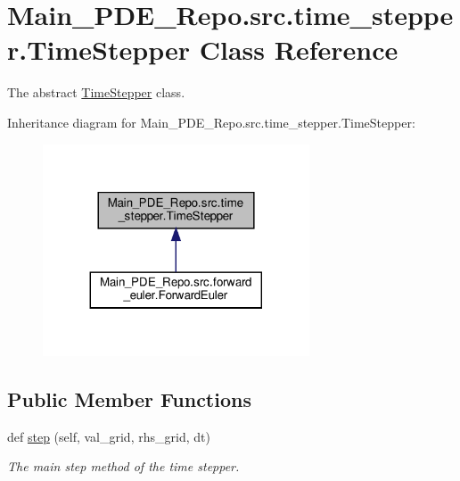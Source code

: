 \hypertarget{classMain__PDE__Repo_1_1src_1_1time__stepper_1_1TimeStepper}{}\section{Main\+\_\+\+P\+D\+E\+\_\+\+Repo.\+src.\+time\+\_\+stepper.\+Time\+Stepper Class Reference}
\label{classMain__PDE__Repo_1_1src_1_1time__stepper_1_1TimeStepper}


The abstract \hyperlink{classMain__PDE__Repo_1_1src_1_1time__stepper_1_1TimeStepper}{Time\+Stepper} class.  




Inheritance diagram for Main\+\_\+\+P\+D\+E\+\_\+\+Repo.\+src.\+time\+\_\+stepper.\+Time\+Stepper\+:
\nopagebreak
\begin{figure}[H]
\begin{center}
\leavevmode
\includegraphics[width=224pt]{classMain__PDE__Repo_1_1src_1_1time__stepper_1_1TimeStepper__inherit__graph}
\end{center}
\end{figure}
\subsection*{Public Member Functions}
\begin{DoxyCompactItemize}
\item 
def \hyperlink{classMain__PDE__Repo_1_1src_1_1time__stepper_1_1TimeStepper_a4e5f0ba51d77777a3ef499258f1982ac}{step} (self, val\+\_\+grid, rhs\+\_\+grid, dt)
\begin{DoxyCompactList}\small\item\em The main step method of the time stepper. \end{DoxyCompactList}\end{DoxyCompactItemize}


